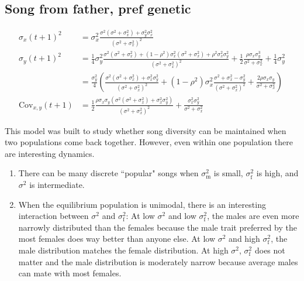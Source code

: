 \documentclass{article}
\newcommand{\Cov}{\text{Cov}}
\begin{document}
\begin{landscape}
\subsection{Song from father, pref genetic}
\begin{align}
\sigma_{x}(t+1)^2&=\sigma_{x}^2\frac{\sigma^2(\sigma^2+\sigma_{x}^2)+\sigma_y^2\sigma_x^2}{(\sigma^2+\sigma_x^2)^2}
\\ \sigma_y(t+1)^2&=\frac{1}{4}\sigma_y^2\frac{\sigma^2(\sigma^2+\sigma_x^2)+(1-\rho^2)\sigma_x^2(\sigma^2+\sigma_x^2)+\rho^2\sigma_x^2\sigma_y^2}{(\sigma^2+\sigma_x^2)^2}+\frac{1}{2}\frac{\rho\sigma_x\sigma_y^3}{\sigma^2+\sigma_x^2}+\frac{1}{4}\sigma_y^2
\\ &=\frac{\sigma_y^2}{4}\left(\frac{\sigma^2(\sigma^2+\sigma_x^2)+\sigma_x^2\sigma_y^2}{(\sigma^2+\sigma_x^2)^2}+(1-\rho^2)\sigma_x^2\frac{\sigma^2+\sigma_x^2-\sigma_y^2}{(\sigma^2+\sigma_x^2)^2}+\frac{2\rho\sigma_x\sigma_y}{\sigma^2+\sigma_x^2}\right)
\\ \Cov_{x,y}(t+1)&=\frac{1}{2}\frac{\rho\sigma_x\sigma_y\left(\sigma^2(\sigma^2+\sigma_x^2)+\sigma_x^2\sigma_y^2\right)}{(\sigma^2+\sigma_x^2)^2}+\frac{\sigma_x^2\sigma_y^2}{\sigma^2+\sigma_x^2}
\end{align}
\end{landscape} 




This model was built to study whether song diversity can be maintained when two populations come back together. However, even within one population there are interesting dynamics.
\begin{enumerate}
\item There can be many discrete ``popular" songs when $\sigma_\text{m}^2$  is small, $\sigma_\text{f}^2$ is high, and $\sigma^2$ is intermediate.
\item When the equilibrium population is unimodal, there is an interesting interaction between $\sigma^2$ and $\sigma_\text{f}^2$: At low $\sigma^2$ and low $\sigma_\text{f}^2$, the males are even more narrowly distributed than the females because the male trait preferred by the most females does way better than anyone else. At low $\sigma^2$ and high $\sigma_\text{f}^2$, the male distribution matches the female distribution. At high $\sigma^2$, $\sigma_\text{f}^2$ does not matter and the male distribution is moderately narrow because average males can mate with most females. 
\end{enumerate}



\end{document}
